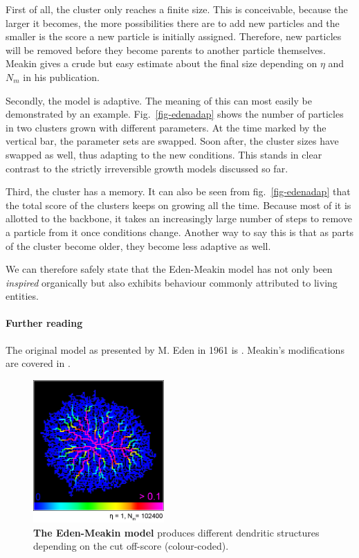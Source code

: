 \documentclass[twocolumn,10pt]{scrartcl}
\begin{document}
        First of all, the cluster only reaches a finite size. This is conceivable, because the larger it
        becomes, the more possibilities there are to add new particles and the smaller is the score a new
        particle is initially assigned. Therefore, new particles will be removed before they become parents
        to another particle themselves. Meakin gives a crude but easy estimate about the final size depending on
        $\eta$ and $N_m$ in his publication.

        Secondly, the model is adaptive. The meaning of this can most easily be demonstrated by an example.
        Fig.~\ref{fig-edenadap} shows the number of particles in two clusters grown with different parameters.
        At the time marked by the vertical bar, the parameter sets are swapped. Soon after, the cluster
        sizes have swapped as well, thus adapting to the new conditions. This stands in clear contrast to the
        strictly irreversible growth models discussed so far.

        Third, the cluster has a memory. It can also be seen from fig.~\ref{fig-edenadap} that the total score
        of the clusters keeps on growing all the time. Because most of it is allotted to the backbone, it
        takes an increasingly large number of steps to remove a particle from it once conditions change.
        Another way to say this is that as parts of the cluster become older, they become less adaptive as well.

        We can therefore safely state that the Eden-Meakin model has not only been \emph{inspired} organically
        but also exhibits behaviour commonly attributed to living entities.

        {\small
            \paragraph{Further reading}
            The original model as presented by M. Eden in 1961 is \cite{src-eden}. Meakin's modifications are
            covered in \cite{src-meakin-eden}.
        }

        \begin{figure}
            \center
            \includegraphics[width=5cm]{img/eden.png}
            \caption[The Eden-Meakin model]
                {\small\textbf{The Eden-Meakin model} produces different dendritic structures depending on the
                cut off-score (colour-coded).}
            \label{fig-eden}
        \end{figure}
\end{document}
